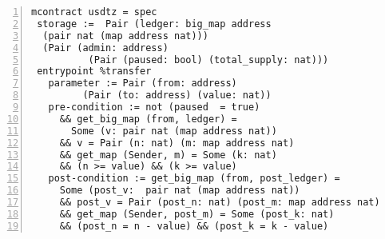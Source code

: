 \begin{lstlisting}[float,captionpos=b,caption={Specification of the \lstinline/transfer/ entrypoint},label={lst:specification-transfer},numbers=left]
mcontract usdtz = spec 
 storage :=  Pair (ledger: big_map address 
  (pair nat (map address nat))) 
  (Pair (admin: address) 
          (Pair (paused: bool) (total_supply: nat)))
 entrypoint %transfer
   parameter := Pair (from: address)
         (Pair (to: address) (value: nat))
   pre-condition := not (paused  = true)
     && get_big_map (from, ledger) = 
       Some (v: pair nat (map address nat))
     && v = Pair (n: nat) (m: map address nat)
     && get_map (Sender, m) = Some (k: nat) 
     && (n >= value) && (k >= value)
   post-condition := get_big_map (from, post_ledger) = 
     Some (post_v:  pair nat (map address nat))
     && post_v = Pair (post_n: nat) (post_m: map address nat) 
     && get_map (Sender, post_m) = Some (post_k: nat) 
     && (post_n = n - value) && (post_k = k - value)
\end{lstlisting}

